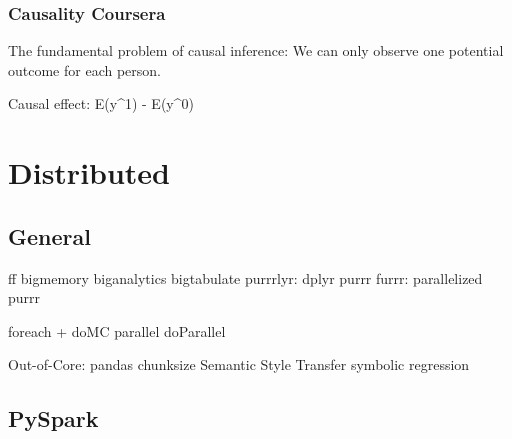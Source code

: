 \documentclass[]{book}
\begin{document}
\subsection{Causality Coursera}\label{causality-coursera}

The fundamental problem of causal inference: We can only observe one
potential outcome for each person.

Causal effect: E(y\^{}1) - E(y\^{}0)

\chapter{Distributed}\label{distributed}

\section{General}\label{general-10}

ff \textbar{} bigmemory \textbar{} biganalytics \textbar{} bigtabulate
\textbar{} purrrlyr: dplyr purrr \textbar{} furrr: parallelized purrr

foreach + doMC \textbar{} parallel \textbar{} doParallel

Out-of-Core: pandas chunksize Semantic Style Transfer symbolic
regression

\section{PySpark}\label{pyspark}
\end{document}
